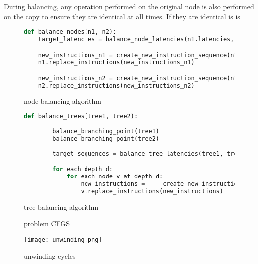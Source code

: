 \documentclass{article}
\begin{document}
During balancing, any operation performed on the original node is also performed on the copy to ensure they are identical at all times. If they are identical is is 


\begin{figure}
	\begin{lstlisting}[language=Python]
	def balance_nodes(n1, n2):
    target_latencies = balance_node_latencies(n1.latencies, n2.latencies)

    new_instructions_n1 = create_new_instruction_sequence(n1.instructions, target_latencies)
    n1.replace_instructions(new_instructions_n1)

    new_instructions_n2 = create_new_instruction_sequence(n1.instructions, target_latencies)
    n2.replace_instructions(new_instructions_n2)
\end{lstlisting}
\caption{node balancing algorithm}
\label{node_balancing}
\end{figure}


\begin{figure}
	\begin{lstlisting}[language=Python]
	def balance_trees(tree1, tree2):
	
		balance_branching_point(tree1)
		balance_branching_point(tree2)
	
		target_sequences = balance_tree_latencies(tree1, tree2)

		for each depth d: 
			for each node v at depth d:
				new_instructions =     create_new_instruction_sequence(v.instructions, target_sequences[d])
    			v.replace_instructions(new_instructions)
\end{lstlisting}
\caption{tree balancing algorithm}
\label{tree_balancing}
\end{figure}


\begin{figure}
\begin{center}
\end{center}

\caption{problem CFGS}
\label{problem_cfg}
\end{figure}



\begin{figure}
\begin{center}
\texttt{[image: unwinding.png]}
\end{center}
\caption{unwinding cycles}
\label{unwinding_cycles}
\end{figure}
\end{document}
